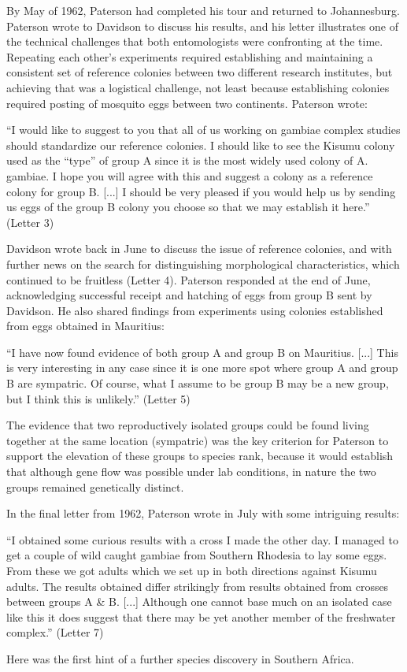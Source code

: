 \documentclass[a4paper,11pt,abstracton,hidelinks]{scrartcl}
\begin{document}
By May of 1962, Paterson had completed his tour and returned to Johannesburg.
%
Paterson wrote to Davidson to discuss his results, and his letter illustrates one of the technical challenges that both entomologists were confronting at the time.
%
Repeating each other's experiments required establishing and maintaining a consistent set of reference colonies between two different research institutes, but achieving that was a logistical challenge, not least because establishing colonies required posting of mosquito eggs between two continents.
%
Paterson wrote:
\begin{displayquote}
``I would like to suggest to you that all of us working on gambiae complex studies should standardize our reference colonies.
%
I should like to see the Kisumu colony used as the ``type'' of group A since it is the most widely used colony of A. gambiae.
%
I hope you will agree with this and suggest a colony as a reference colony for group B. 
%
[...] I should be very pleased if you would help us by sending us eggs of the group B colony you choose so that we may establish it here.'' (Letter 3)
\end{displayquote}


Davidson wrote back in June to discuss the issue of reference colonies, and with further news on the search for distinguishing morphological characteristics, which continued to be fruitless (Letter 4).
%
Paterson responded at the end of June, acknowledging successful receipt and hatching of eggs from group B sent by Davidson.
%
He also shared findings from experiments using colonies established from eggs obtained in Mauritius:
\begin{displayquote}
``I have now found evidence of both group A and group B on Mauritius. [...] 
%
This is very interesting in any case since it is one more spot where group A and group B are sympatric.
%
Of course, what I assume to be group B may be a new group, but I think this is unlikely.'' (Letter 5)
\end{displayquote}
The evidence that two reproductively isolated groups could be found living together at the same location (sympatric) was the key criterion for Paterson to support the elevation of these groups to species rank, because it would establish that although gene flow was possible under lab conditions, in nature the two groups remained genetically distinct.


In the final letter from 1962, Paterson wrote in July with some intriguing results:
\begin{displayquote}
``I obtained some curious results with a cross I made the other day. I managed to get a couple of wild caught gambiae from Southern Rhodesia to lay some eggs. From these we got adults which we set up in both directions against Kisumu adults. The results obtained differ strikingly from results obtained from crosses between groups A \& B. [...] Although one cannot base much on an isolated case like this it does suggest that there may be yet another member of the freshwater complex.'' (Letter 7)
\end{displayquote}
%
Here was the first hint of a further species discovery in Southern Africa.
\end{document}
